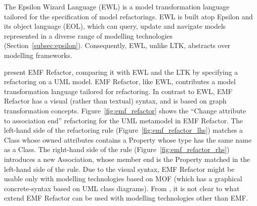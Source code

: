The Epsilon Wizard Language (EWL) \cite{kolovos07ewl} is a model transformation language tailored for the specification of model refactorings. EWL is built atop Epsilon and its object language (EOL), which can query, update and navigate models represented in a diverse range of modelling technologies (Section~\ref{subsec:epsilon}). Consequently, EWL, unlike LTK, abstracts over modelling frameworks.

\cite{arendt09refactoring} present EMF Refactor, comparing it with EWL and the LTK by specifying a refactoring on a UML model. EMF Refactor, like EWL, contributes a model transformation language tailored for refactoring. In contrast to EWL, EMF Refactor has a visual (rather than textual) syntax, and is based on graph transformation concepts. Figure~\ref{fig:emf_refactor} shows the ``Change attribute to association end'' refactoring for the UML metamodel in EMF Refactor. The left-hand side of the refactoring rule (Figure~\ref{fig:emf_refactor_lhs}) matches a Class whose owned attributes contains a Property whose type has the same name as a Class. The right-hand side of the rule (Figure~\ref{fig:emf_refactor_rhs}) introduces a new Association, whose member end is the Property matched in the left-hand side of the rule. Due to the visual syntax, EMF Refactor might be usable only with modelling technologies based on MOF (which has a graphical concrete-syntax based on UML class diagrams).  From \cite{arendt09refactoring}, it is not clear to what extend EMF Refactor can be used with modelling technologies other than EMF.

